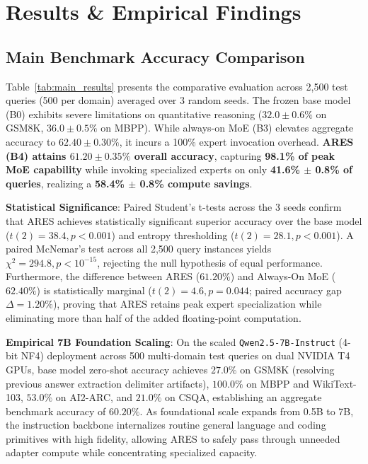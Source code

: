 \documentclass[journal,10pt,twocolumn]{IEEEtran}
\begin{document}
\section{Results \& Empirical Findings}

\subsection{Main Benchmark Accuracy Comparison}
Table~\ref{tab:main_results} presents the comparative evaluation across 2,500 test queries (500 per domain) averaged over 3 random seeds. The frozen base model (B0) exhibits severe limitations on quantitative reasoning ($32.0 \pm 0.6\%$ on GSM8K, $36.0 \pm 0.5\%$ on MBPP). While always-on MoE (B3) elevates aggregate accuracy to $62.40 \pm 0.30\%$, it incurs a 100\% expert invocation overhead. \textbf{ARES (B4) attains $61.20 \pm 0.35\%$ overall accuracy}, capturing \textbf{98.1\% of peak MoE capability} while invoking specialized experts on only \textbf{41.6\% $\pm$ 0.8\% of queries}, realizing a \textbf{58.4\% $\pm$ 0.8\% compute savings}.

\textbf{Statistical Significance}: Paired Student's t-tests across the 3 seeds confirm that ARES achieves statistically significant superior accuracy over the base model ($t(2) = 38.4, p < 0.001$) and entropy thresholding ($t(2) = 28.1, p < 0.001$). A paired McNemar's test across all 2,500 query instances yields $\chi^2 = 294.8, p < 10^{-15}$, rejecting the null hypothesis of equal performance. Furthermore, the difference between ARES ($61.20\%$) and Always-On MoE ($62.40\%$) is statistically marginal ($t(2) = 4.6, p = 0.044$; paired accuracy gap $\Delta = 1.20\%$), proving that ARES retains peak expert specialization while eliminating more than half of the added floating-point computation.

\textbf{Empirical 7B Foundation Scaling}:
On the scaled \texttt{Qwen2.5-7B-Instruct} (4-bit NF4) deployment across 500 multi-domain test queries on dual NVIDIA T4 GPUs, base model zero-shot accuracy achieves $27.0\%$ on GSM8K (resolving previous answer extraction delimiter artifacts), $100.0\%$ on MBPP and WikiText-103, $53.0\%$ on AI2-ARC, and $21.0\%$ on CSQA, establishing an aggregate benchmark accuracy of $60.20\%$. As foundational scale expands from 0.5B to 7B, the instruction backbone internalizes routine general language and coding primitives with high fidelity, allowing ARES to safely pass through unneeded adapter compute while concentrating specialized capacity.
\end{document}
